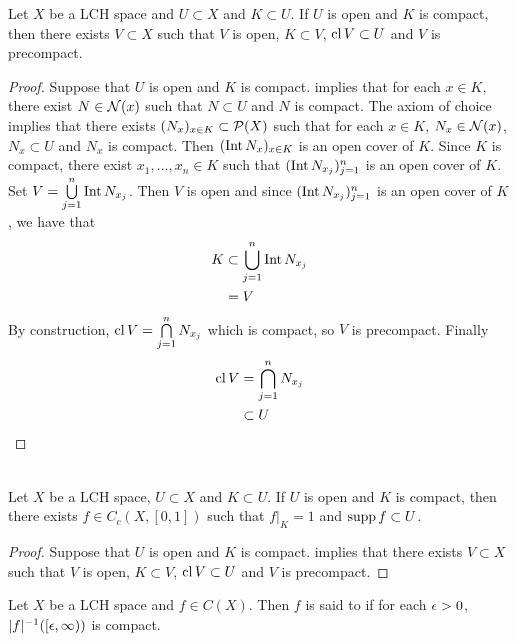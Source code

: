 \documentclass{book}
\begin{document}
\begin{ex}
	Let $X$ be a LCH space and $U \subset X$ and $K \subset U$. If $U$ is open and $K$ is compact, then there exists $V \subset X$ such that $V$ is open, $K \subset V$, $\operatorname{cl} V \subset U$ and $V$ is precompact. 
\end{ex}

\begin{proof}
	Suppose that $U$ is open and $K$ is compact.  implies that for each $x \in K$, there exist $N \in \mathcal{N}(x)$ such that $N \subset U$ and $N$ is compact. The axiom of choice implies that there exists $(N_x)_{x \in K} \subset \mathcal{P}(X)$ such that for each $x \in K$, $N_x \in \mathcal{N}(x)$, $N_x \subset U$ and $N_x$ is compact. Then $(\operatorname{Int} N_x)_{x \in K}$ is an open cover of $K$. Since $K$ is compact, there exist $x_1, \ldots, x_n \in K$ such that $(\operatorname{Int} N_{x_j})_{j=1}^n$ is an open cover of $K$. Set $V = \bigcup\limits_{j=1}^n \operatorname{Int} N_{x_j}$. Then $V$ is open and since $(\operatorname{Int} N_{x_j})_{j=1}^n$ is an open cover of $K$, we have that 
	\begin{align*}
		K
		& \subset \bigcup_{j=1}^n \operatorname{Int} N_{x_j} \\
		& = V \\
	\end{align*}
	By construction, $\operatorname{cl} V = \bigcap\limits_{j=1}^n N_{x_j}$ which is compact, so $V$ is precompact. Finally
	\begin{align*}
		\operatorname{cl} V
		& = \bigcap_{j=1}^n N_{x_j} \\
		& \subset U
	\end{align*}
\end{proof}

\begin{ex}  \\
	Let $X$ be a LCH space, $U \subset X$ and $K \subset U$. If $U$ is open and $K$ is compact, then there exists $f \in C_c(X, [0,1])$ such that $f|_K = 1$ and $\operatorname{supp} f \subset U$.
\end{ex}

\begin{proof}
	Suppose that $U$ is open and $K$ is compact.  implies that there exists $V \subset X$ such that $V$ is open, $K \subset V$, $\operatorname{cl} V \subset U$ and $V$ is precompact. 
\end{proof}

\begin{defn}
	Let $X$ be a LCH space and $f \in C(X)$. Then $f$ is said to  if for each $\epsilon >0$, $|f|^{-1}([\epsilon, \infty))$ is compact.
\end{defn}
\end{document}

